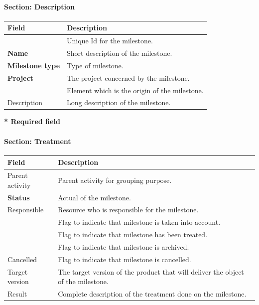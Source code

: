 \documentclass[letterpaper,10pt,english]{sphinxmanual}
\begin{document}
\paragraph{Section: Description}

\begin{tabulary}{\linewidth}{|l|l|}
\hline
\textsf{\relax 
Field
} & \textsf{\relax 
Description
}\\
\hline
{\hyperref[Glossary:term-id]{\emph{}}}
 & 
Unique Id for the milestone.
\\
\hline
\textbf{Name}
 & 
Short description of the milestone.
\\
\hline
\textbf{Milestone type}
 & 
Type of milestone.
\\
\hline
\textbf{Project}
 & 
The project concerned by the milestone.
\\
\hline
{\hyperref[Glossary:term-origin]{\emph{}}}
 & 
Element which is the origin of the milestone.
\\
\hline
Description
 & 
Long description of the milestone.
\\
\hline\end{tabulary}


\textbf{* Required field}
\paragraph{Section: Treatment}

\begin{tabulary}{\linewidth}{|l|l|}
\hline
\textsf{\relax 
Field
} & \textsf{\relax 
Description
}\\
\hline
Parent activity
 & 
Parent activity for grouping purpose.
\\
\hline
\textbf{Status}
 & 
Actual {\hyperref[Glossary:term-status]{\emph{}}} of the milestone.
\\
\hline
Responsible
 & 
Resource who is responsible for the milestone.
\\
\hline
{\hyperref[Glossary:term-handled]{\emph{}}}
 & 
Flag to indicate that milestone is taken into account.
\\
\hline
{\hyperref[Glossary:term-done]{\emph{}}}
 & 
Flag to indicate that milestone has been treated.
\\
\hline
{\hyperref[Glossary:term-closed]{\emph{}}}
 & 
Flag to indicate that milestone is archived.
\\
\hline
Cancelled
 & 
Flag to indicate that milestone is cancelled.
\\
\hline
Target version
 & 
The target version of the product that will deliver the object of the milestone.
\\
\hline
Result
 & 
Complete description of the treatment done on the milestone.
\\
\hline\end{tabulary}
\end{document}
